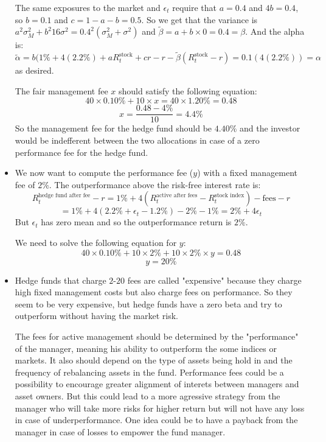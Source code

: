 \documentclass[10pt]{article}
\newenvironment{exercise}[2][Exercise]{\begin{trivlist}
  \item[\hskip \labelsep {\bfseries #1}\hskip \labelsep {\bfseries #2.}]}{\end{trivlist}}
\begin{document}
\begin{exercise}{1. Fund performance and fees}
\begin{itemize}
		The same exposures to the market and $\epsilon_t$ require that $a = 0.4$ and $4b = 0.4$, so $b = 0.1$ and $c = 1- a-b = 0.5$. So we get that the variance is $a^2\sigma_M^2 + b^2 16 \sigma^2 = 0.4^2(\sigma_M^2 + \sigma^2)$ and $\tilde{\beta} = a + b\times 0 = 0.4 = \beta$. 
		And the alpha is: $\tilde{\alpha} = b(1\% + 4(2.2\%) + a R_t^{\text{stock}} + cr -r - \tilde{\beta}(R_t^{\text{stock}}-r) = 0.1(4(2.2\%)) = \alpha$ as desired. 

		The fair management fee $x$ should satisfy the following equation: 
		$$ 40 \times 0.10\% + 10 \times x = 40\times 1.20\% = 0.48 $$
		$$ x = \frac{0.48 - 4\%}{10} = 4.4\%$$
		So the management fee for the hedge fund should be $4.40\%$ and the investor would be indefferent between the two allocations in case of a zero performance fee for the hedge fund.
		\item[e)] We now want to compute the performance fee ($y$) with a fixed management fee of $2\%$. The outperformance above the risk-free interest rate is: $$ R_t^{\text{hedge fund after fee}} -r = 1\% + 4(R_t^{\text{active after fees}}-R_t^{\text{stock index}}) - \text{fees} -r  $$ $$ = 1\% + 4(2.2\% +\epsilon_t - 1.2\%) -2\% - 1\%  = 2\% + 4\epsilon_t$$ 
		But $\epsilon_t$ has zero mean and so the outperformance return is $2\%$. 

		We need to solve the following equation for $y$: $$ 40 \times 0.10\% + 10\times 2\% + 10\times 2\% \times y = 0.48 $$ $$ y = 20\%$$ 
		\item[f)] Hedge funds that charge $2$-$20$ fees are called "expensive" because they charge high fixed management costs but also charge fees on performance. So they seem to be very expensive, but hedge funds have a zero beta and try to outperform without having the market risk.  
		
		The fees for active management should be determined by the "performance" of the manager, meaning his ability to outperform the some indices or markets. It also should depend on the type of assets being hold in and the frequency of rebalancing assets in the fund. Performance fees could be a possibility to encourage greater alignment of interets between managers and asset owners. But this could lead to a more agressive strategy from the manager who will take more risks for higher return but will not have any loss in case of underperformance. One idea could be to have a payback from the manager in case of losses to empower the fund manager. 
	\end{itemize}
\end{exercise}
\end{document}
